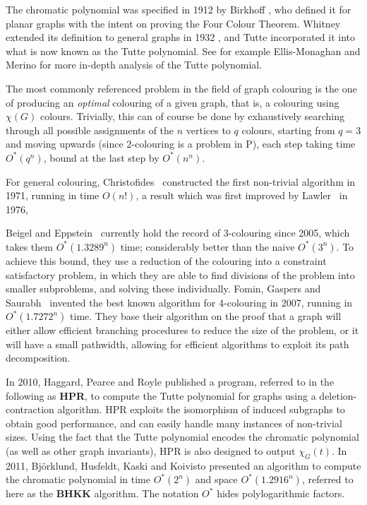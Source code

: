 \documentclass{cslthse-msc}
\begin{document}


The chromatic polynomial was specified in 1912 by Birkhoff \cite{birkhoff}, who defined it for planar graphs with the intent on proving the Four Colour Theorem. Whitney extended its definition to general graphs in 1932 \cite{whitney}, and Tutte incorporated it into what is now known as the Tutte polynomial. See for example Ellis-Monaghan and Merino \cite{tuttebook} for more in-depth analysis of the Tutte polynomial.

The most commonly referenced problem in the field of graph colouring is the one of producing an \emph{optimal} colouring of a given graph, that is, a colouring using $\chi(G)$ colours. Trivially, this can of course be done by exhaustively searching through all possible assignments of the $n$ vertices to $q$ colours, starting from $q = 3$ and moving upwards (since 2-colouring is a problem in P), each step taking time $O^*(q^n)$, bound at the last step by $O^*(n^n)$. 

For general colouring, Christofides~\cite{christo} constructed the first non-trivial algorithm in 1971, running in time $O(n!)$, a result which was first improved by Lawler~\cite{lawler} in 1976, 

Beigel and Eppstein~\cite{3coloring} currently hold the record of 3-colouring since 2005, which takes them $O^*(1.3289^n)$ time; considerably better than the naive $O^*(3^n)$. To achieve this bound, they use a reduction of the colouring into a constraint satisfactory problem, in which they are able to find divisions of the problem into smaller subproblems, and solving these individually.
Fomin, Gaspers and Saurabh~\cite{4coloring} invented the best known algorithm for 4-colouring in 2007, running in $O^*(1.7272^n)$ time. They base their algorithm on the proof that a graph will either allow efficient branching procedures to reduce the size of the problem, or it will have a small pathwidth, allowing for efficient algorithms to exploit its path decomposition.

In 2010, Haggard, Pearce and Royle \cite{haggard} published a program, referred to in the following as \textbf{HPR}, to compute the Tutte polynomial for graphs using a deletion-contraction algorithm. HPR exploits the isomorphism of induced subgraphs to obtain good performance, and can easily handle many instances of non-trivial sizes. Using the fact that the Tutte polynomial encodes the chromatic polynomial (as well as other graph invariants), HPR is also designed to output $\chi_G(t)$. 
In 2011, Björklund, Husfeldt, Kaski and Koivisto \cite{cov_pack} presented an algorithm to compute the chromatic polynomial in time $O^*(2^n)$ and space $O^*(1.2916^n)$, referred to here as the \textbf{BHKK} algorithm. The notation $O^*$ hides polylogarithmic factors.
\end{document}
